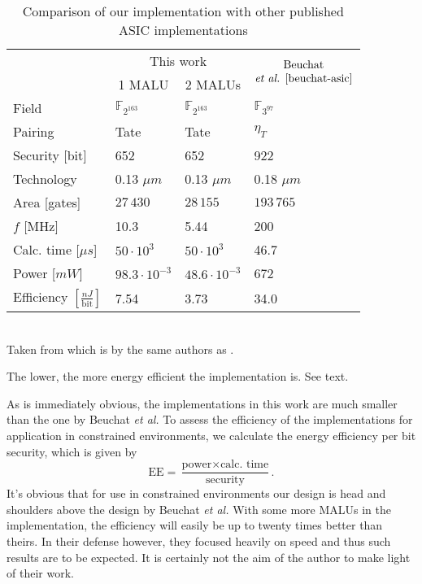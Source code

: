 \begin{table}[h]
	\caption{Comparison of our implementation with other published ASIC implementations}
	\label{table-asic}
		\centering
		\begin{tabular}{llll}
			\toprule
			&	\multicolumn{2}{c}{This work}	& \multirow{2}{*}{$\begin{array}{@{}c@{}}\text{Beuchat}\\\text{\emph{et al.} \cite{beuchat-asic}}\end{array}$}\\
			\cmidrule(r){2-3}
			& \multicolumn{1}{c}{1 MALU} & \multicolumn{1}{c}{2 MALUs} &\\
	 		\midrule
			Field																				& $\mathbb{F}_{2^{163}}$	& $\mathbb{F}_{2^{163}}$	& $\mathbb{F}_{3^{97}}$\\
			Pairing																			& Tate							& Tate							& $\eta_T$\\
			Security [bit]\footnotemark[2]											& 652								& 652								& 922\\
			Technology																		& 0.13 $\mu m$					& 0.13 $\mu m$					& 0.18 $\mu m$\\
			Area [gates]																	& $27\,430$						& $28\,155$						& $193\,765$\\
			$f$ [MHz]																		& 10.3							& 5.44							& 200\\
			Calc. time [$\mu s$]															& $50 \cdot 10^3$				& $50 \cdot 10^3$				& 46.7\\
			Power [$mW$]																	& $98.3 \cdot 10^{-3}$		& $48.6 \cdot 10^{-3}$		& 672\\
			Efficiency $\left[ \frac{nJ}{\text{bit}}\right]$\footnotemark[3]	& 7.54						& 3.73							& 34.0\\
			\bottomrule		
		\end{tabular}
		\\[3pt]			
		\footnotesize \footnotemark[2] Taken from \cite{beuchat} which is by the same authors as \cite{beuchat-asic}.
		
		\footnotemark[3] The lower, the more energy efficient the implementation is. See text. 
\end{table}

As is immediately obvious, the implementations in this work are much smaller than the one by Beuchat \emph{et al.} To assess the efficiency of the implementations for application in constrained environments, we calculate the energy efficiency per bit security, which is given by
\begin{displaymath}\text{EE} = \frac{\text{power} \times \text{calc. time}}{\text{security}}.\end{displaymath}
It's obvious that for use in constrained environments our design is head and shoulders above the design by Beuchat \emph{et al.} With some more MALUs in the implementation, the efficiency will easily be up to twenty times better than theirs. In their defense however, they focused heavily on speed and thus such results are to be expected. It is certainly not the aim of the author to make light of their work.
